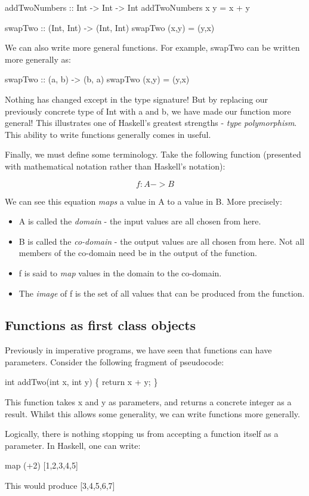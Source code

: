 \documentclass[../alevelcs.tex]{subfiles}
\begin{document}
	addTwoNumbers :: Int -> Int -> Int
	addTwoNumbers x y = x + y

	swapTwo :: (Int, Int) -> (Int, Int)
	swapTwo (x,y) = (y,x)

	We can also write more general functions. For example, swapTwo can be written more generally as:

	swapTwo :: (a, b) -> (b, a)
	swapTwo (x,y) = (y,x)

	Nothing has changed except in the type signature! But by replacing our previously concrete type of Int with a and b, we have made our function more general! This illustrates one of Haskell's greatest strengths - \textit{type polymorphism}. This ability to write functions generally comes in useful.

	Finally, we must define some terminology. Take the following function (presented with mathematical notation rather than Haskell's notation):

	\begin{equation}
		f: A -> B
	\end{equation}

	We can see this equation \textit{maps} a value in A to a value in B. More precisely:

	\begin{itemize}
		\item A is called the \textit{domain} - the input values are all chosen from here.
		\item B is called the \textit{co-domain} - the output values are all chosen from here. Not all members of the co-domain need be in the output of the function.
		\item f is said to \textit{map} values in the domain to the co-domain.
		\item The \textit{image} of f is the set of all values that can be produced from the function.
	\end{itemize}

	\subsection{Functions as first class objects}
	Previously in imperative programs, we have seen that functions can have parameters. Consider the following fragment of pseudocode:


			int addTwo(int x, int y) \{
				return x + y;
			\}
	
	This function takes x and y as parameters, and returns a concrete integer as a result. Whilst this allows some generality, we can write functions more generally.

	Logically, there is nothing stopping us from accepting a function itself as a parameter. In Haskell, one can write:

	
	map (+2) [1,2,3,4,5]
	
	This would produce [3,4,5,6,7]
	
\end{document}
